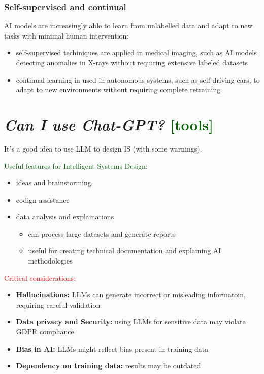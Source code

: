 \subsubsection{Self-supervised and continual}
AI models are increasingly able to learn from unlabelled data and adapt to new 
tasks with minimal human intervention:
\begin{itemize}
    \item self-supervised techiniques are applied in medical imaging, such as AI models 
    detecting anomalies in X-rays without requiring extensive labeled datasets 
    \item continual learning in used in autonomous systems, such as self-driving cars, to adapt 
    to new environments without requiring complete retraining
\end{itemize}

\section{\textit{Can I use Chat-GPT?} \textcolor{darkgreen}{[tools]}}
It's a good idea to use LLM to design IS (with some warnings).

\noindent \textcolor{darkgreen}{Useful features for Intelligent Systems Design:}
\begin{itemize}
    \item ideas and brainstorming 
    \item codign assistance 
    \item data analysis and explainations
    \begin{itemize}
        \item can process large datasets and generate reports
        \item useful for creating technical documentation and explaining AI methodologies
    \end{itemize}
\end{itemize}

\noindent \textcolor{red}{Critical considerations:}
\begin{itemize}
    \item \textbf{Hallucinations:} LLMs can generate incorrect or misleading informatoin, requiring 
    careful validation
    \item \textbf{Data privacy and Security:} using LLMs for sensitive data may violate GDPR compliance
    \item \textbf{Bias in AI:} LLMs might reflect bias present in training data 
    \item \textbf{Dependency on training data:} results may be outdated

\end{itemize}

